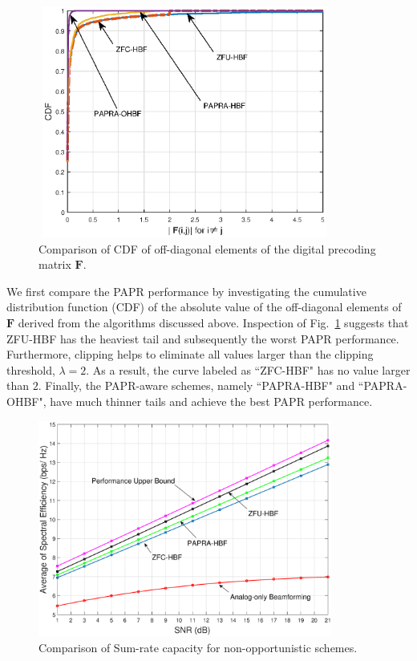 \documentclass[conference]{IEEEtran}
\begin{document}
\begin{figure}[ht]
	\begin{center}
	\includegraphics[width=3.8in,height=3in]{Figure/cdf2.eps}
\caption{Comparison of CDF of off-diagonal elements of the digital precoding matrix ${\bm F}$.}\label{fig:CDF}
    \end{center}
\end{figure}

We first compare the PAPR performance by investigating the cumulative distribution function (CDF) of the absolute value of the off-diagonal elements of ${\bm F}$ derived from the algorithms discussed above. Inspection of Fig.~\ref{fig:CDF} suggests that ZFU-HBF has the heaviest tail and subsequently the worst PAPR performance. Furthermore, clipping helps to eliminate all values larger than the clipping threshold, {\em $\lambda=2$}. As a result, the curve labeled as ``ZFC-HBF" has no value larger than $2$. Finally, the PAPR-aware schemes, namely ``PAPRA-HBF" and ``PAPRA-OHBF", have much thinner tails and achieve the best PAPR performance.

\begin{figure}[ht]
 	\begin{center}
 	\includegraphics[width=3.8in,height=2.8in]{Figure/SpectralEffNoSelection3.eps}
 	\caption{Comparison of Sum-rate capacity for non-opportunistic schemes.}\label{fig:SpectralEffNoSelection}
    \end{center}
\end{figure}
\end{document}
